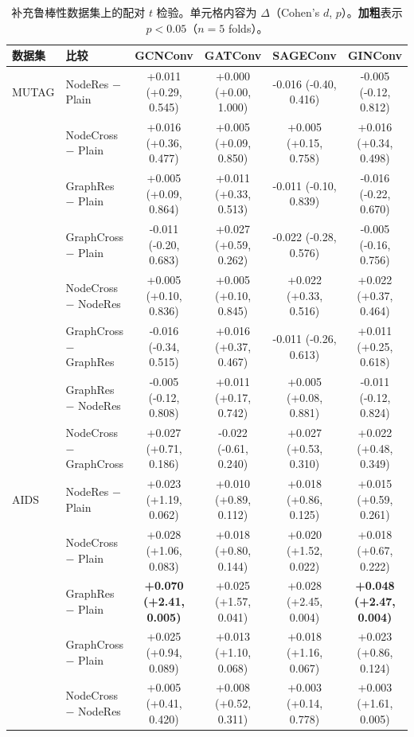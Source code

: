 \begin{table}[t]
\centering
\scriptsize
\setlength{\tabcolsep}{3pt}
\caption{补充鲁棒性数据集上的配对 $t$ 检验。单元格内容为 $\Delta$（Cohen's $d$, $p$）。\textbf{加粗}表示 $p<0.05$（$n{=}5$ folds）。}
\label{tab:statistical_tests_supp}
\begin{tabular}{llcccc}
\toprule
数据集 & 比较 & GCNConv & GATConv & SAGEConv & GINConv \\
\midrule
MUTAG & NodeRes $-$ Plain & +0.011 (+0.29, 0.545) & +0.000 (+0.00, 1.000) & -0.016 (-0.40, 0.416) & -0.005 (-0.12, 0.812) \\
 & NodeCross $-$ Plain & +0.016 (+0.36, 0.477) & +0.005 (+0.09, 0.850) & +0.005 (+0.15, 0.758) & +0.016 (+0.34, 0.498) \\
 & GraphRes $-$ Plain & +0.005 (+0.09, 0.864) & +0.011 (+0.33, 0.513) & -0.011 (-0.10, 0.839) & -0.016 (-0.22, 0.670) \\
 & GraphCross $-$ Plain & -0.011 (-0.20, 0.683) & +0.027 (+0.59, 0.262) & -0.022 (-0.28, 0.576) & -0.005 (-0.16, 0.756) \\
 & NodeCross $-$ NodeRes & +0.005 (+0.10, 0.836) & +0.005 (+0.10, 0.845) & +0.022 (+0.33, 0.516) & +0.022 (+0.37, 0.464) \\
 & GraphCross $-$ GraphRes & -0.016 (-0.34, 0.515) & +0.016 (+0.37, 0.467) & -0.011 (-0.26, 0.613) & +0.011 (+0.25, 0.618) \\
 & GraphRes $-$ NodeRes & -0.005 (-0.12, 0.808) & +0.011 (+0.17, 0.742) & +0.005 (+0.08, 0.881) & -0.011 (-0.12, 0.824) \\
 & NodeCross $-$ GraphCross & +0.027 (+0.71, 0.186) & -0.022 (-0.61, 0.240) & +0.027 (+0.53, 0.310) & +0.022 (+0.48, 0.349) \\
\midrule
AIDS & NodeRes $-$ Plain & +0.023 (+1.19, 0.062) & +0.010 (+0.89, 0.112) & +0.018 (+0.86, 0.125) & +0.015 (+0.59, 0.261) \\
 & NodeCross $-$ Plain & +0.028 (+1.06, 0.083) & +0.018 (+0.80, 0.144) & +0.020 (+1.52, 0.022) & +0.018 (+0.67, 0.222) \\
 & GraphRes $-$ Plain & \textbf{+0.070 (+2.41, 0.005)} & +0.025 (+1.57, 0.041) & +0.028 (+2.45, 0.004) & \textbf{+0.048 (+2.47, 0.004)} \\
 & GraphCross $-$ Plain & +0.025 (+0.94, 0.089) & +0.013 (+1.10, 0.068) & +0.018 (+1.16, 0.067) & +0.023 (+0.86, 0.124) \\
 & NodeCross $-$ NodeRes & +0.005 (+0.41, 0.420) & +0.008 (+0.52, 0.311) & +0.003 (+0.14, 0.778) & +0.003 (+1.61, 0.005) \\

\end{tabular}
\end{table}
